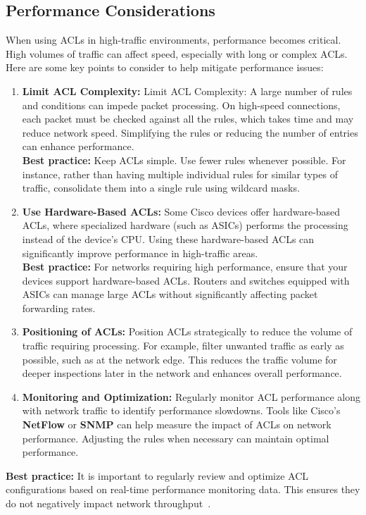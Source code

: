 \documentclass[11pt,a4paper]{article}
\begin{document}
    \subsection*{Performance Considerations}
        When using ACLs in high-traffic environments, performance becomes critical. High volumes of traffic can affect speed, especially with long or complex ACLs. Here are some key points to consider to help mitigate performance issues:
            \begin{enumerate}
                \item \textbf{Limit ACL Complexity:} Limit ACL Complexity: A large number of rules and conditions can impede packet processing. On high-speed connections, each packet must be checked against all the rules, which takes time and may reduce network speed. Simplifying the rules or reducing the number of entries can enhance performance.
                \\[1em]
                \textbf{Best practice:} Keep ACLs simple. Use fewer rules whenever possible. For instance, rather than having multiple individual rules for similar types of traffic, consolidate them into a single rule using wildcard masks.
                \\[1em]
                \item \textbf{Use Hardware-Based ACLs:} Some Cisco devices offer hardware-based ACLs, where specialized hardware (such as ASICs) performs the processing instead of the device's CPU. Using these hardware-based ACLs can significantly improve performance in high-traffic areas.
                \\[1em]
                \textbf{Best practice:} For networks requiring high performance, ensure that your devices support hardware-based ACLs. Routers and switches equipped with ASICs can manage large ACLs without significantly affecting packet forwarding rates.
                \\[1em]
                \item \textbf{Positioning of ACLs:} Position ACLs strategically to reduce the volume of traffic requiring processing. For example, filter unwanted traffic as early as possible, such as at the network edge. This reduces the traffic volume for deeper inspections later in the network and enhances overall performance.
                \\[1em]
                \item \textbf{Monitoring and Optimization:} Regularly monitor ACL performance along with network traffic to identify performance slowdowns. Tools like Cisco’s \textbf{NetFlow} or \textbf{SNMP} can help measure the impact of ACLs on network performance. Adjusting the rules when necessary can maintain optimal performance.
                \\[1em]

            \end{enumerate}
        \textbf{Best practice:} It is important to regularly review and optimize ACL configurations based on real-time performance monitoring data. This ensures they do not negatively impact network throughput~\cite{How-Work}.
\end{document}
